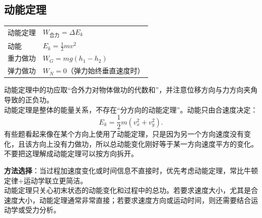 
\subsection{动能定理}
\begin{tabularx}{\columnwidth}{XX}
  动能定理 & $W_{\text{合力}}=\Delta E_k$ \\
  动能   & $E_k=\frac12mv^2$          \\
  重力做功 & $W_G=mg(h_1-h_2)$          \\
  弹力做功 & $W_N=0$（弹力始终垂直速度时）         \\
\end{tabularx}

\begin{formulanotebox}
  动能定理中的功应取“合外力对物体做功的代数和”，并注意位移方向与力方向夹角导致的正负功。\\
  动能定理是整体的能量关系，不存在“分方向的动能定理”。动能只由合速度决定：
  \[
    E_k=\frac12m(v_x^2+v_y^2).
  \]
  有些题看起来像在某个方向上使用了动能定理，只是因为另一个方向速度没有变化，且该方向上没有力做功，所以总动能变化刚好等于某一方向速度平方的变化。不要把这理解成动能定理可以按方向拆开。
\end{formulanotebox}

\begin{keypointbox}
  \textbf{方法选择}：当过程加速度变化或时间信息不直接时，优先考虑动能定理，常比牛顿定律+运动学联立更简洁。\\
  动能定理只关心初末状态的动能变化和过程中的总功。若要求速度大小，尤其是合速度大小，动能定理通常非常直接；若要求速度方向或运动时间，则还需要结合运动学或受力分析。
\end{keypointbox}

